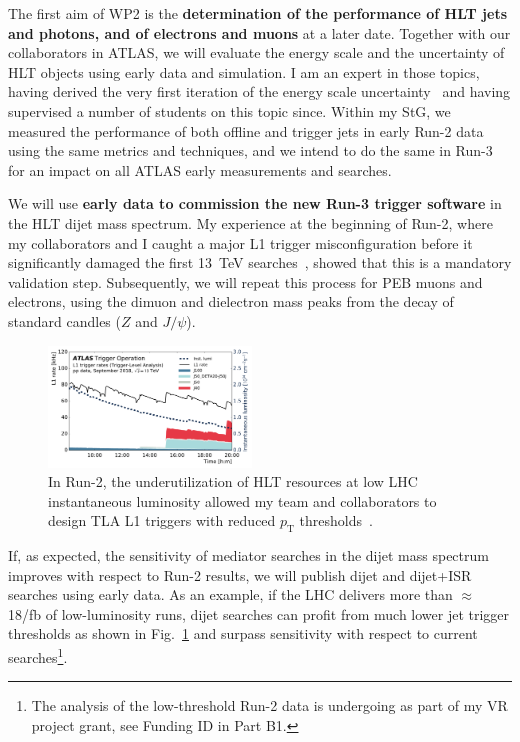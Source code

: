 The first aim of WP2 is the \textbf{determination of the performance of HLT jets and photons, and of electrons and muons} at a later date. 
Together with our collaborators in ATLAS, we will evaluate the energy scale and the uncertainty of HLT objects using early data and simulation. 
I am an expert in those topics, having derived the very first iteration of the energy scale uncertainty~\cite{Doglioni:2011ema} %
and having supervised a number of students on this topic since. 
Within my StG, we measured the performance of both offline and trigger jets in early Run-2 data using the same metrics and techniques, 
and we intend to do the same in Run-3 for an impact on all ATLAS early measurements and searches.  

We will use \textbf{early data to commission the new Run-3 trigger software} in the HLT dijet mass spectrum. 
My experience at the beginning of Run-2, where my collaborators and I caught a major L1 trigger misconfiguration before it significantly damaged the first 13~TeV searches~\cite{Collaboration:2035503}, showed that this is a mandatory validation step. 
Subsequently, we will repeat this process for PEB muons and electrons, using the dimuon and dielectron mass peaks from the decay of standard candles ($Z$ and $J/\psi$). 

\begin{figure} 
\begin{center}
\includegraphics[width=0.48\textwidth]{figs_B2/TLAPublicWinter2019_L1Lumi.pdf}
\caption{\color{black}\label{fig:triggerLowThreshold} \small In Run-2, the underutilization of HLT resources at low LHC instantaneous luminosity allowed my team and collaborators to design TLA L1 triggers with reduced $p_\mathrm{T}$ thresholds~\cite{ATLASTrigger}.} %
\vskip2pt
\end{center}
\end{figure}

If, as expected, the sensitivity of mediator searches in the dijet mass spectrum improves with respect to Run-2 results, we will publish dijet and dijet+ISR searches using early data.
As an example, if the LHC delivers more than $\approx$ 18/fb of low-luminosity runs, dijet searches can profit from much lower jet trigger thresholds as shown in Fig.~\ref{fig:triggerLowThreshold} and surpass sensitivity with respect to current searches\footnote{The analysis of the low-threshold Run-2 data is undergoing as part of my VR project grant, see Funding ID in Part B1.}. 

